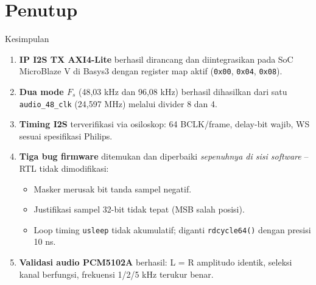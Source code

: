 \documentclass[aspectratio=169]{beamer}
\begin{document}
\section{Penutup}

\begin{frame}{Kesimpulan}
  \begin{enumerate}
    \item \textbf{IP I2S TX AXI4-Lite} berhasil dirancang dan diintegrasikan
          pada SoC MicroBlaze V di Basys3 dengan register map aktif
          (\texttt{0x00}, \texttt{0x04}, \texttt{0x08}).

    \item \textbf{Dua mode $F_s$} (48,03 kHz dan 96,08 kHz) berhasil dihasilkan
          dari satu \texttt{audio\_48\_clk} (24,597 MHz) melalui divider 8 dan 4.

    \item \textbf{Timing I2S} terverifikasi via osiloskop: 64 BCLK/frame, delay-bit
          wajib, WS sesuai spesifikasi Philips.

    \item \textbf{Tiga bug firmware} ditemukan dan diperbaiki \textit{sepenuhnya
          di sisi software} -- RTL tidak dimodifikasi:
          \begin{itemize}\small
            \item Masker merusak bit tanda sampel negatif.
            \item Justifikasi sampel 32-bit tidak tepat (MSB salah posisi).
            \item Loop timing \texttt{usleep} tidak akumulatif; diganti
                  \texttt{rdcycle64()} dengan presisi 10 ns.
          \end{itemize}

    \item \textbf{Validasi audio PCM5102A} berhasil: L = R amplitudo identik,
          seleksi kanal berfungsi, frekuensi 1/2/5 kHz terukur benar.
  \end{enumerate}
\end{frame}
\end{document}
